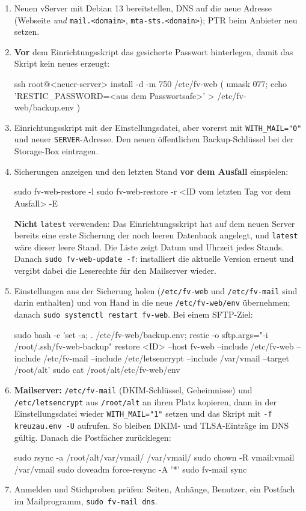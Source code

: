\documentclass[a4paper,fontsize=10pt]{scrartcl}
\newcommand*{\cmd}[1]{\texttt{#1}}
\newcommand*{\pfad}[1]{\texttt{#1}}
\begin{document}
\begin{enumerate}
  \item Neuen vServer mit Debian 13 bereitstellen, DNS auf die neue Adresse
        (Webseite \emph{und} \cmd{mail.<domain>}, \cmd{mta-sts.<domain>}); PTR beim
        Anbieter neu setzen.
  \item \textbf{Vor} dem Einrichtungsskript das gesicherte Passwort hinterlegen, damit
        das Skript kein neues erzeugt:
\begin{befehl}
ssh root@<neuer-server>
install -d -m 750 /etc/fv-web
( umask 077; echo 'RESTIC_PASSWORD=<aus dem Passwortsafe>' > /etc/fv-web/backup.env )
\end{befehl}
  \item Einrichtungsskript mit der Einstellungsdatei, aber
        vorerst mit \cmd{WITH\_MAIL="0"} und neuer \cmd{SERVER}-Adresse. Den neuen öffentlichen
        Backup-Schlüssel bei der Storage-Box eintragen.
  \item Sicherungen anzeigen und den letzten Stand \textbf{vor dem Ausfall} einspielen:
\begin{befehl}
sudo fv-web-restore -l
sudo fv-web-restore -r <ID vom letzten Tag vor dem Ausfall> -E
\end{befehl}
        \textbf{Nicht} \cmd{latest} verwenden: Das Einrichtungsskript hat auf dem neuen
        Server bereits eine erste Sicherung der noch leeren Datenbank angelegt, und
        \cmd{latest} wäre dieser leere Stand. Die Liste zeigt Datum und Uhrzeit jedes
        Stands.
        Danach \cmd{sudo fv-web-update -f}: installiert die aktuelle Version erneut und
        vergibt dabei die Leserechte für den Mailserver wieder.
  \item Einstellungen aus der Sicherung holen (\pfad{/etc/fv-web} und
        \pfad{/etc/fv-mail} sind darin enthalten) und von Hand in die neue
        \pfad{/etc/fv-web/env} übernehmen; danach \cmd{sudo systemctl restart fv-web}.
        Bei einem SFTP-Ziel:
\begin{befehl}
sudo bash -c 'set -a; . /etc/fv-web/backup.env; restic -o sftp.args="-i /root/.ssh/fv-web-backup" restore <ID> --host fv-web --include /etc/fv-web --include /etc/fv-mail --include /etc/letsencrypt --include /var/vmail --target /root/alt'
sudo cat /root/alt/etc/fv-web/env
\end{befehl}
  \item \textbf{Mailserver:} \pfad{/etc/fv-mail} (DKIM-Schlüssel, Geheimnisse) und
        \pfad{/etc/letsencrypt} aus \pfad{/root/alt} an ihren Platz kopieren, dann
        in der Einstellungsdatei wieder \cmd{WITH\_MAIL="1"} setzen und das Skript mit
        \cmd{-f kreuzau.env -U} aufrufen. So bleiben DKIM- und TLSA-Einträge im DNS
        gültig. Danach die Postfächer zurücklegen:
\begin{befehl}
sudo rsync -a /root/alt/var/vmail/ /var/vmail/
sudo chown -R vmail:vmail /var/vmail
sudo doveadm force-resync -A '*'
sudo fv-mail sync
\end{befehl}
  \item Anmelden und Stichproben prüfen: Seiten, Anhänge, Benutzer, ein Postfach im
        Mailprogramm, \cmd{sudo fv-mail dns}.
\end{enumerate}
\end{document}
